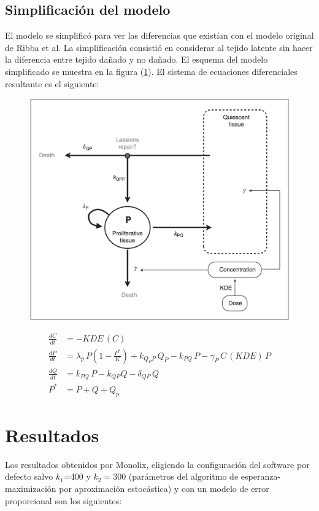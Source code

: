 \documentclass[letterpaper,12pt]{article}
\theoremstyle{definition} \newtheorem{Def}{Definición}[section]
\theoremstyle{definition} \newtheorem{Teo}{Teorema}[section]
\theoremstyle{definition} \newtheorem{Pro}{Proposición}
\theoremstyle{definition} \newtheorem{Lema}{Lema}[section]
\theoremstyle{definition} \newtheorem{Cor}{Corolario}[section]
\begin{document}
\subsection{Simplificación del modelo}

El modelo se simplificó para ver las diferencias que existían con el modelo original de Ribba et al. La simplificación consistió en considerar al tejido latente sin hacer la diferencia entre tejido dañado y no dañado. El esquema del modelo simplificado se muestra en la figura (\ref{modelosimple}). El sistema de ecuaciones diferenciales resultante es el siguiente:

\begin{figure}[h]
	\centering
	\includegraphics[angle=0,width=.8\textwidth]{modelosimple.png}
	\caption{\label{modelosimple}}
\end{figure}

\begin{align*}
\frac{dC}{dt}&=-KDE \,(C)\\
\frac{dP}{dt}&=\lambda_p \, P \left ( 1-\frac{P^*}{K}\right) + k_{Q_PP}\,Q_P-k_{PQ}\,P-\gamma_P\, C \, (KDE) \, P\\
\frac{dQ}{dt}&=k_{PQ}\,P- k_{QP}Q-\delta_{QP}\,Q\\
P^*&=P+Q+Q_p
\end{align*} 

\section{Resultados}

Los resultados obtenidos por Monolix, eligiendo la configuración del software por defecto salvo $k_1$=400 y $k_2=300$ (parámetros del algoritmo de esperanza-maximización por aproximación estocástica) y con un modelo de error proporcional son los siguientes:
\end{document}

